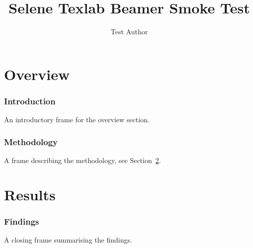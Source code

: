 \documentclass{beamer}
\title{Selene Texlab Beamer Smoke Test}
\author{Test Author}
\begin{document}
\frame{\titlepage}

\section{Overview}

\begin{frame}
\frametitle{Introduction}
\label{frame:intro}
An introductory frame for the overview section.
\end{frame}

\begin{frame}
\frametitle{Methodology}
\label{frame:method}
A frame describing the methodology, see Section~\ref{sec:results}.
\end{frame}

\section{Results}
\label{sec:results}

\begin{frame}
\frametitle{Findings}
A closing frame summarising the findings.
\end{frame}
\end{document}
